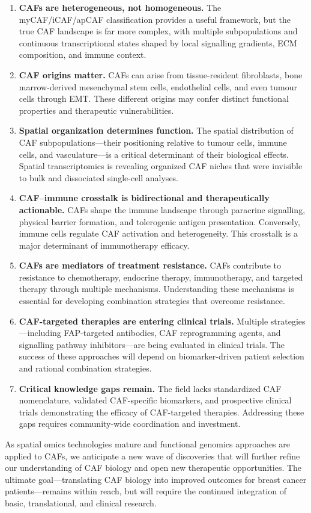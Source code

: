\begin{enumerate}
  \item \textbf{CAFs are heterogeneous, not homogeneous.} The myCAF/iCAF/apCAF classification provides a useful framework, but the true CAF landscape is far more complex, with multiple subpopulations and continuous transcriptional states shaped by local signalling gradients, ECM composition, and immune context.

  \item \textbf{CAF origins matter.} CAFs can arise from tissue-resident fibroblasts, bone marrow-derived mesenchymal stem cells, endothelial cells, and even tumour cells through EMT. These different origins may confer distinct functional properties and therapeutic vulnerabilities.

  \item \textbf{Spatial organization determines function.} The spatial distribution of CAF subpopulations---their positioning relative to tumour cells, immune cells, and vasculature---is a critical determinant of their biological effects. Spatial transcriptomics is revealing organized CAF niches that were invisible to bulk and dissociated single-cell analyses.

  \item \textbf{CAF--immune crosstalk is bidirectional and therapeutically actionable.} CAFs shape the immune landscape through paracrine signalling, physical barrier formation, and tolerogenic antigen presentation. Conversely, immune cells regulate CAF activation and heterogeneity. This crosstalk is a major determinant of immunotherapy efficacy.

  \item \textbf{CAFs are mediators of treatment resistance.} CAFs contribute to resistance to chemotherapy, endocrine therapy, immunotherapy, and targeted therapy through multiple mechanisms. Understanding these mechanisms is essential for developing combination strategies that overcome resistance.

  \item \textbf{CAF-targeted therapies are entering clinical trials.} Multiple strategies---including FAP-targeted antibodies, CAF reprogramming agents, and signalling pathway inhibitors---are being evaluated in clinical trials. The success of these approaches will depend on biomarker-driven patient selection and rational combination strategies.

  \item \textbf{Critical knowledge gaps remain.} The field lacks standardized CAF nomenclature, validated CAF-specific biomarkers, and prospective clinical trials demonstrating the efficacy of CAF-targeted therapies. Addressing these gaps requires community-wide coordination and investment.
\end{enumerate}

As spatial omics technologies mature and functional genomics approaches are applied to CAFs, we anticipate a new wave of discoveries that will further refine our understanding of CAF biology and open new therapeutic opportunities. The ultimate goal---translating CAF biology into improved outcomes for breast cancer patients---remains within reach, but will require the continued integration of basic, translational, and clinical research.
